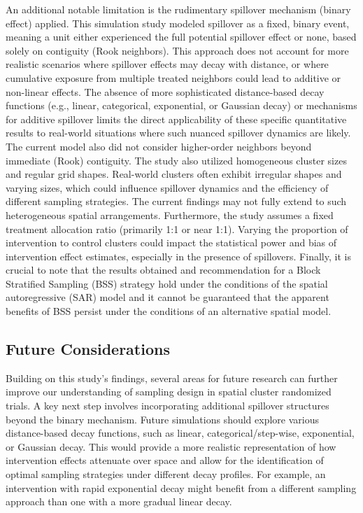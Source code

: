 \documentclass{article}[11pt]
\begin{document}
An additional notable limitation is the rudimentary spillover mechanism (binary effect) applied. This simulation study modeled spillover as a fixed, binary event, meaning a unit either experienced the full potential spillover effect or none, based solely on contiguity (Rook neighbors). This approach does not account for more realistic scenarios where spillover effects may decay with distance, or where cumulative exposure from multiple treated neighbors could lead to additive or non-linear effects. The absence of more sophisticated distance-based decay functions (e.g., linear, categorical, exponential, or Gaussian decay) or mechanisms for additive spillover limits the direct applicability of these specific quantitative results to real-world situations where such nuanced spillover dynamics are likely. The current model also did not consider higher-order neighbors beyond immediate (Rook) contiguity. The study also utilized homogeneous cluster sizes and regular grid shapes. Real-world clusters often exhibit irregular shapes and varying sizes, which could influence spillover dynamics and the efficiency of different sampling strategies. The current findings may not fully extend to such heterogeneous spatial arrangements. Furthermore, the study assumes a fixed treatment allocation ratio (primarily 1:1 or near 1:1). Varying the proportion of intervention to control clusters could impact the statistical power and bias of intervention effect estimates, especially in the presence of spillovers. Finally, it is crucial to note that the results obtained and recommendation for a Block Stratified Sampling (BSS) strategy hold under the conditions of the spatial autoregressive (SAR) model and it cannot be guaranteed that the apparent benefits of BSS persist under the conditions of an alternative spatial model.

\subsection{Future Considerations}

Building on this study's findings, several areas for future research can further improve our
understanding of sampling design in spatial cluster randomized trials. A key next step involves incorporating additional spillover structures beyond the binary mechanism. Future simulations should explore various distance-based decay functions, such
as linear, categorical/step-wise, exponential, or Gaussian decay. This would provide a more
realistic representation of how intervention effects attenuate over space and allow for the
identification of optimal sampling strategies under different decay profiles. For example, an
intervention with rapid exponential decay might benefit from a different sampling approach
than one with a more gradual linear decay.
\end{document}
